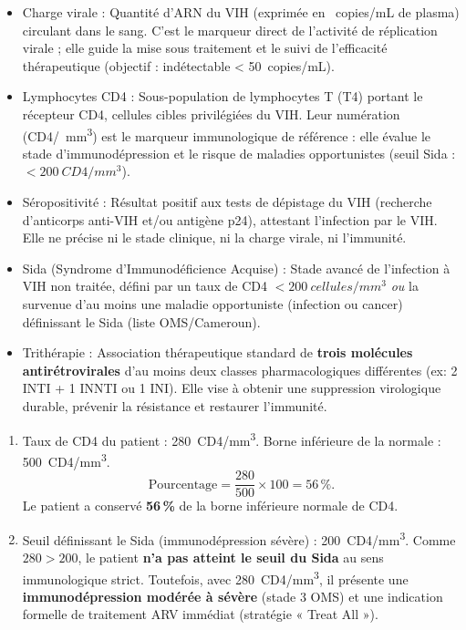 \documentclass[11pt]{article}
\newcommand{\cle}[1]{{\popxbold\color{popdark}#1}}
\begin{document}
\begin{corrige}
\begin{itemize}
\item \cle{Charge virale} : Quantité d'ARN du VIH (exprimée en \SI{}{copies/mL} de plasma) circulant dans le sang. C'est le marqueur direct de l'activité de réplication virale ; elle guide la mise sous traitement et le suivi de l'efficacité thérapeutique (objectif : indétectable < \SI{50}{copies/mL}).
\item \cle{Lymphocytes CD4} : Sous-population de lymphocytes T (T4) portant le récepteur CD4, cellules cibles privilégiées du VIH. Leur numération (CD4/\SI{}{mm^3}) est le marqueur immunologique de référence : elle évalue le stade d'immunodépression et le risque de maladies opportunistes (seuil Sida : $< \SI{200}{CD4/mm^3}$).
\item \cle{Séropositivité} : Résultat positif aux tests de dépistage du VIH (recherche d'anticorps anti-VIH et/ou antigène p24), attestant l'infection par le VIH. Elle ne précise ni le stade clinique, ni la charge virale, ni l'immunité.
\item \cle{Sida} (Syndrome d'Immunodéficience Acquise) : Stade avancé de l'infection à VIH non traitée, défini par un taux de CD4 $< \SI{200}{cellules/mm^3}$ \emph{ou} la survenue d'au moins une maladie opportuniste (infection ou cancer) définissant le Sida (liste OMS/Cameroun).
\item \cle{Trithérapie} : Association thérapeutique standard de \textbf{trois molécules antirétrovirales} d'au moins deux classes pharmacologiques différentes (ex: 2 INTI + 1 INNTI ou 1 INI). Elle vise à obtenir une suppression virologique durable, prévenir la résistance et restaurer l'immunité.
\end{itemize}
\end{corrige}

\begin{corrige}
\begin{enumerate}
\item Taux de CD4 du patient : \SI{280}{CD4/mm^3}. Borne inférieure de la normale : \SI{500}{CD4/mm^3}.
\[
\text{Pourcentage} = \frac{280}{500} \times 100 = 56\,\%.
\]
Le patient a conservé \textbf{56\,\%} de la borne inférieure normale de CD4.
\item Seuil définissant le Sida (immunodépression sévère) : \SI{200}{CD4/mm^3}.
Comme $280 > 200$, le patient \textbf{n'a pas atteint le seuil du Sida} au sens immunologique strict. Toutefois, avec \SI{280}{CD4/mm^3}, il présente une \textbf{immunodépression modérée à sévère} (stade 3 OMS) et une indication formelle de traitement ARV immédiat (stratégie « Treat All »).
\end{enumerate}
\end{corrige}
\end{document}
